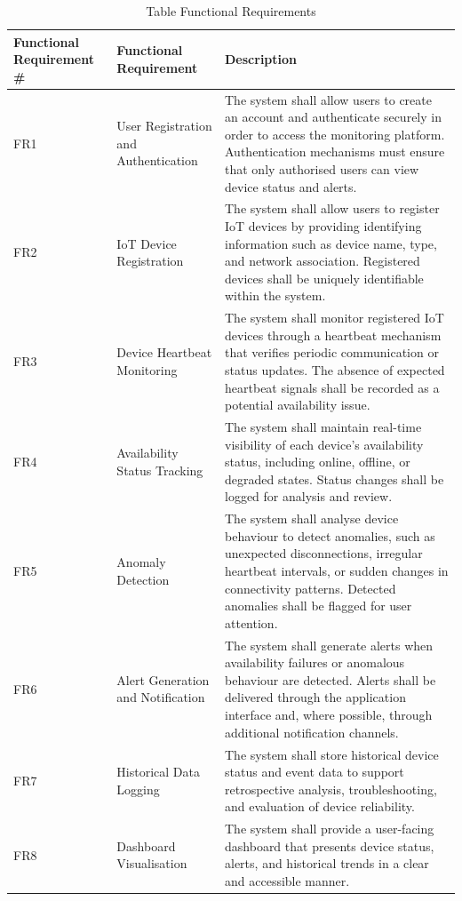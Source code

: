 \begin{table}[htbp]
  \centering
  \small
  \caption{Table  Functional Requirements}
  \label{tab:ica1_2}
\begin{tabular}{p{}p{}p{}}
\toprule
Functional Requirement \# & Functional Requirement & Description \\
\midrule
FR1 & User Registration and Authentication & The system shall allow users to create an account and authenticate securely in order to access the monitoring platform. Authentication mechanisms must ensure that only authorised users can view device status and alerts. \\
FR2 & IoT Device Registration & The system shall allow users to register IoT devices by providing identifying information such as device name, type, and network association. Registered devices shall be uniquely identifiable within the system. \\
FR3 & Device Heartbeat Monitoring & The system shall monitor registered IoT devices through a heartbeat mechanism that verifies periodic communication or status updates. The absence of expected heartbeat signals shall be recorded as a potential availability issue. \\
FR4 & Availability Status Tracking & The system shall maintain real-time visibility of each device's availability status, including online, offline, or degraded states. Status changes shall be logged for analysis and review. \\
FR5 & Anomaly Detection & The system shall analyse device behaviour to detect anomalies, such as unexpected disconnections, irregular heartbeat intervals, or sudden changes in connectivity patterns. Detected anomalies shall be flagged for user attention. \\
FR6 & Alert Generation and Notification & The system shall generate alerts when availability failures or anomalous behaviour are detected. Alerts shall be delivered through the application interface and, where possible, through additional notification channels. \\
FR7 & Historical Data Logging & The system shall store historical device status and event data to support retrospective analysis, troubleshooting, and evaluation of device reliability. \\
FR8 & Dashboard Visualisation & The system shall provide a user-facing dashboard that presents device status, alerts, and historical trends in a clear and accessible manner. \\
\bottomrule
\end{tabular}
\end{table}

